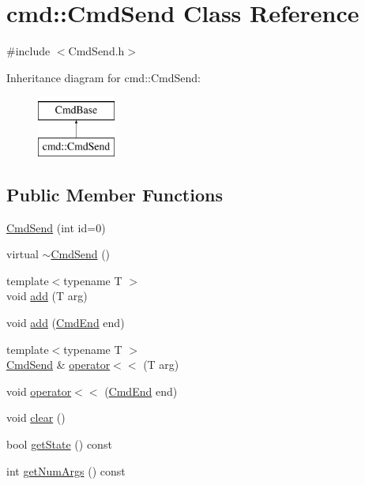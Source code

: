 \hypertarget{classcmd_1_1_cmd_send}{\section{cmd\+:\+:Cmd\+Send Class Reference}
\label{classcmd_1_1_cmd_send}
}


{\ttfamily \#include $<$Cmd\+Send.\+h$>$}

Inheritance diagram for cmd\+:\+:Cmd\+Send\+:\begin{figure}[H]
\begin{center}
\leavevmode
\includegraphics[height=2.000000cm]{classcmd_1_1_cmd_send}
\end{center}
\end{figure}
\subsection*{Public Member Functions}
\begin{DoxyCompactItemize}
\item 
\hyperlink{classcmd_1_1_cmd_send_a0bde526ff8e0d36be47f2ad4f614be99}{Cmd\+Send} (int id=0)
\item 
virtual \hyperlink{classcmd_1_1_cmd_send_abf939f6219c5c5d5e5caf59d36b7d3ed}{$\sim$\+Cmd\+Send} ()
\item 
{\footnotesize template$<$typename T $>$ }\\void \hyperlink{classcmd_1_1_cmd_send_adf3459b9e64391790a844ade051a07eb}{add} (T arg)
\item 
void \hyperlink{classcmd_1_1_cmd_send_a189a3db925e6be886c787c1206846b1a}{add} (\hyperlink{class_cmd_end}{Cmd\+End} end)
\item 
{\footnotesize template$<$typename T $>$ }\\\hyperlink{classcmd_1_1_cmd_send}{Cmd\+Send} \& \hyperlink{classcmd_1_1_cmd_send_a4c90185bdf7ed1b3442bd69a2a9cd5b2}{operator$<$$<$} (T arg)
\item 
void \hyperlink{classcmd_1_1_cmd_send_ae11b3feb18c2b48113ad048c7f2bda2e}{operator$<$$<$} (\hyperlink{class_cmd_end}{Cmd\+End} end)
\item 
void \hyperlink{classcmd_1_1_cmd_send_abefba8ff2e9c9c2e13c3ccda96a34e32}{clear} ()
\item 
bool \hyperlink{classcmd_1_1_cmd_send_a2906af83411722ad6ca6d074e3155396}{get\+State} () const 
\item 
int \hyperlink{classcmd_1_1_cmd_send_a0434b09f3aa8ad368b043163edff3e44}{get\+Num\+Args} () const 
\end{DoxyCompactItemize}
